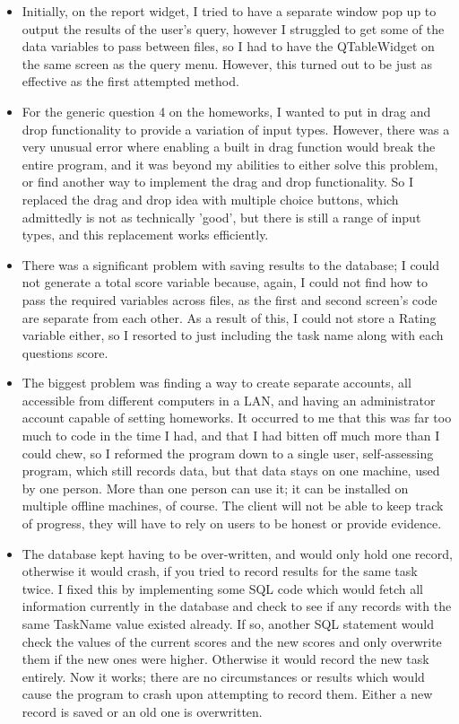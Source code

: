 \begin{itemize}
\item Initially, on the report widget, I tried to have a separate window pop up to output the results of the user's query, however I struggled to get some of the data variables to pass between files, so I had to have the QTableWidget on the same screen as the query menu. However, this turned out to be just as effective as the first attempted method.

\item For the generic question 4 on the homeworks, I wanted to put in drag and drop functionality to provide a variation of input types. However, there was a very unusual error where enabling a built in drag function would break the entire program, and it was beyond my abilities to either solve this problem, or find another way to implement the drag and drop functionality. So I replaced the drag and drop idea with multiple choice buttons, which admittedly is not as technically 'good', but there is still a range of input types, and this replacement works efficiently.

\item There was a significant problem with saving results to the database; I could not generate a total score variable because, again, I could not find how to pass the required variables across files, as the first and second screen's code are separate from each other. As a result of this, I could not store a Rating variable either, so I resorted to just including the task name along with each questions score.

\item The biggest problem was finding a way to create separate accounts, all accessible from different computers in a LAN, and having an administrator account capable of setting homeworks. It occurred to me that this was far too much to code in the time I had, and that I had bitten off much more than I could chew, so I reformed the program down to a single user, self-assessing program, which still records data, but that data stays on one machine, used by one person. More than one person can use it; it can be installed  on multiple offline machines, of course. The client will not be able to keep track of progress, they will have to rely on users to be honest or provide evidence.

\item The database kept having to be over-written, and would only hold one record, otherwise it would crash, if you tried to record results for the same task twice. I fixed this by implementing some SQL code which would fetch all information currently in the database and check to see if any records with the same TaskName value existed already. If so, another SQL statement would check the values of the current scores and the new scores and only overwrite them if the new ones were higher. Otherwise it would record the new task entirely. Now it works; there are no circumstances or results which would cause the program to crash upon attempting to record them. Either a new record is saved or an old one is overwritten.

\end{itemize}

